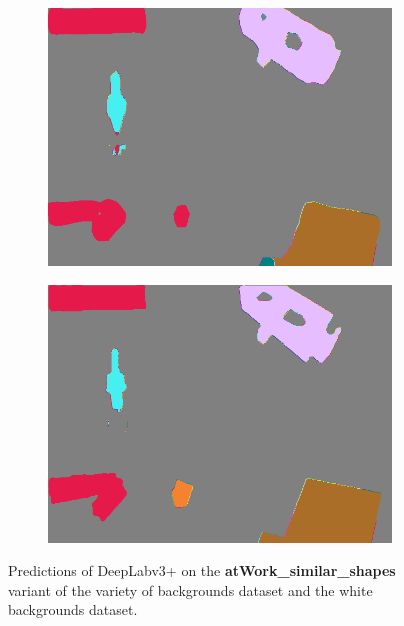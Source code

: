 \begin{figure}[h]
\begin{subfigure}{.24\textwidth}
			\includegraphics[width=1\linewidth]{images/sample_predictions/00017_mob_shape_pred}
		\end{subfigure}
		\begin{subfigure}{.24\textwidth}
			\centering
			\includegraphics[width=1\linewidth]{images/sample_predictions/00017_xcep_shape_pred}
		\end{subfigure}
		\caption{Predictions of DeepLabv3+ on the \textbf{atWork\_similar\_shapes} variant of the variety of backgrounds dataset and the white backgrounds dataset.}
		\label{Fig:sam_shape}
	\end{figure}

